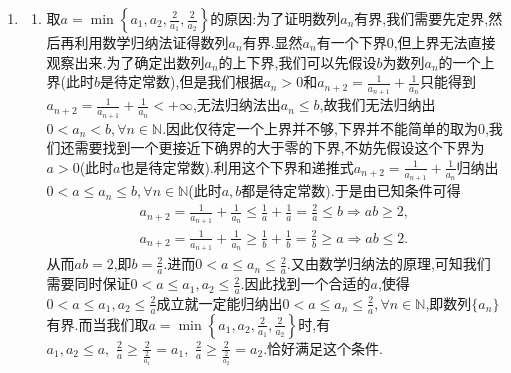 \documentclass[../../main.tex]{subfiles}%
\begin{document}
\begin{note}
\begin{enumerate}
\item 
\begin{enumerate}[(1)]
\item  \label{example3.24(1)}
取$a=\min \left\{ a_1,a_2,\frac{2}{a_1},\frac{2}{a_2} \right\}$的原因:为了证明数列${a_n}$有界,我们需要先定界,然后再利用数学归纳法证得数列${a_n}$有界.显然${a_n}$有一个下界0,但上界无法直接观察出来.为了确定出数列${a_n}$的上下界,我们可以先假设$b$为数列${a_n}$的一个上界(此时$b$是待定常数),但是我们根据$a_n>0$和$a_{n+2}=\frac{1}{a_{n+1}}+\frac{1}{a_n}$只能得到$a_{n+2}=\frac{1}{a_{n+1}}+\frac{1}{a_n}<+\infty$,无法归纳法出$a_n\leqslant  b$,故我们无法归纳出$0<a_n<b,\forall n\in\mathbb{N}$.因此仅待定一个上界并不够,下界并不能简单的取为0,我们还需要找到一个更接近下确界的大于零的下界,不妨先假设这个下界为$a>0$(此时$a$也是待定常数).利用这个下界和递推式$a_{n+2}=\frac{1}{a_{n+1}}+\frac{1}{a_n}$归纳出$0<a\leqslant  a_n\leqslant  b,\forall n\in\mathbb{N}$(此时$a,b$都是待定常数).于是由已知条件可得
\begin{gather*}
a_{n+2}=\frac{1}{a_{n+1}}+\frac{1}{a_n}\leqslant \frac{1}{a}+\frac{1}{a}=\frac{2}{a}\leqslant b\Rightarrow ab\geqslant 2,
\\
a_{n+2}=\frac{1}{a_{n+1}}+\frac{1}{a_n}\geqslant \frac{1}{b}+\frac{1}{b}=\frac{2}{b}\geqslant a\Rightarrow ab\leqslant 2.
\end{gather*}
从而$ab=2$,即$b=\frac{2}{a}$.进而$0<a\leqslant  a_n\leqslant \frac{2}{a}$.又由数学归纳法的原理,可知我们需要同时保证$0<a\leqslant  a_1,a_2\leqslant  \frac{2}{a}$.因此找到一个合适的$a$,使得$0<a\leqslant  a_1,a_2\leqslant  \frac{2}{a}$成立就一定能归纳出$0<a\leqslant  a_n\leqslant  \frac{2}{a},\forall n\in\mathbb{N}$,即数列$\{a_n\}$有界.而当我们取$a=\min \left\{ a_1,a_2,\frac{2}{a_1},\frac{2}{a_2} \right\}$时,有$a_1,a_2\leqslant a,\,\,\frac{2}{a}\geqslant \frac{2}{\frac{2}{a_1}}=a_1,\,\,\frac{2}{a}\geqslant \frac{2}{\frac{2}{a_2}}=a_2.$恰好满足这个条件.


\end{enumerate}
\end{enumerate}
\end{note}
\end{document}
